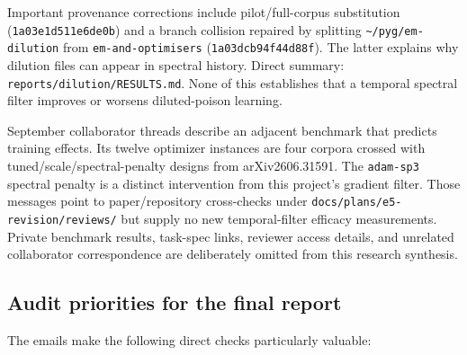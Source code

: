 \documentclass[
  british,
  10pt,
  a4paper,
]{article}
\begin{document}
Important provenance corrections include
pilot/\allowbreak{}full-\allowbreak{}corpus substitution
(\texttt{1a03e1d511e6\allowbreak{}de0b}) and a branch collision repaired
by splitting
\texttt{\textasciitilde{}\allowbreak{}/\allowbreak{}pyg/\allowbreak{}em-\allowbreak{}dilution}
from \texttt{em-\allowbreak{}and-\allowbreak{}optimisers}
(\texttt{1a03dcb94f44\allowbreak{}d88f}). The latter explains why
dilution files can appear in spectral history. Direct summary:
\texttt{reports/\allowbreak{}dilution/\allowbreak{}RESULTS.\allowbreak{}md}.
None of this establishes that a temporal spectral filter improves or
worsens diluted-\allowbreak{}poison learning.

September collaborator threads describe an adjacent benchmark that
predicts training effects. Its twelve optimizer instances are four
corpora crossed with
tuned/\allowbreak{}scale/\allowbreak{}spectral-\allowbreak{}penalty
designs from arXiv2606.\allowbreak{}31591.\allowbreak{} The
\texttt{adam-sp3} spectral penalty is a distinct intervention from this
project's gradient filter. Those messages point to
paper/\allowbreak{}repository cross-\allowbreak{}checks under
\texttt{docs/\allowbreak{}plans/\allowbreak{}e5-\allowbreak{}revision/\allowbreak{}reviews/\allowbreak{}}
but supply no new temporal-\allowbreak{}filter efficacy
measurements\allowbreak{}.\allowbreak{} Private benchmark results,
task-spec links, reviewer access details, and unrelated collaborator
correspondence are deliberately omitted from this research synthesis.

\subsection{Audit priorities for the final
report}\label{email-evidence--audit-priorities-for-the-final-report}

The emails make the following direct checks particularly valuable:
\end{document}
